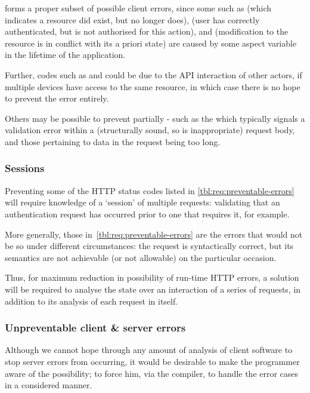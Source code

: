\FloatBarrier
{} forms a proper subset of possible client errors, since some such as  (which indicates a resource did exist, but no longer does),  (user has correctly authenticated, but is not authorised for this action), and  (modification to the resource is in conflict with its a priori state) are caused by some aspect variable in the lifetime of the application.

Further, codes such as  and  could be due to the API interaction of other actors, if multiple devices have access to the same resource, in which case there is no hope to prevent the error entirely.

Others may be possible to prevent partially - such as the  which typically signals a validation error within a (structurally sound, so  is inappropriate) request body, and those pertaining to data in the request being too long. \cite{rfc7252}

\subsubsection{Sessions} \label{intro:req:sessions}
Preventing some of the HTTP status codes listed in \cref{tbl:req:preventable-errors} will require knowledge of a `session' of multiple requests: validating that an authentication request has occurred prior to one that requires it, for example.

More generally, those in~\cref{tbl:req:preventable-errors} are the errors that would not be so under different circumstances: the request is syntactically correct, but its semantics are not achievable (or not allowable) on the particular occasion.

Thus, for maximum reduction in possibility of run-time HTTP errors, a solution will be required to analyse the state over an interaction of a series of requests, in addition to its analysis of each request in itself.

\subsubsection{Unpreventable client \& server errors} \label{intro:req:unpreventable}
Although we cannot hope through any amount of analysis of client software to stop server errors from occurring, it would be desirable to make the programmer aware of the possibility; to force him, via the compiler, to handle the error cases in a considered manner.

